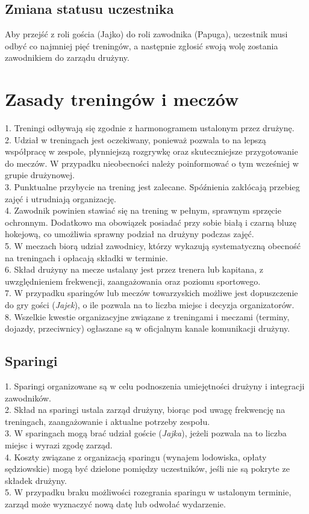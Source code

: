 \documentclass[12pt,a4paper]{article}
\begin{document}
\subsection{Zmiana statusu uczestnika}
Aby przejść z roli gościa (Jajko) do roli zawodnika (Papuga), uczestnik musi odbyć co najmniej pięć treningów, a następnie zgłosić swoją wolę zostania zawodnikiem do zarządu drużyny.

\section{Zasady treningów i meczów}
1. Treningi odbywają się zgodnie z harmonogramem ustalonym przez drużynę.\\
2. Udział w treningach jest oczekiwany, ponieważ pozwala to na lepszą współpracę w zespole, płynniejszą rozgrywkę oraz skuteczniejsze przygotowanie do meczów. W przypadku nieobecności należy poinformować o tym wcześniej w grupie drużynowej.\\
3. Punktualne przybycie na trening jest zalecane. Spóźnienia zakłócają przebieg zajęć i utrudniają organizację.\\
4. Zawodnik powinien stawiać się na trening w pełnym, sprawnym sprzęcie ochronnym. Dodatkowo ma obowiązek posiadać przy sobie białą i czarną bluzę hokejową, co umożliwia sprawny podział na drużyny podczas zajęć.\\
5. W meczach biorą udział zawodnicy, którzy wykazują systematyczną obecność na treningach i opłacają składki w terminie.\\
6. Skład drużyny na mecze ustalany jest przez trenera lub kapitana, z uwzględnieniem frekwencji, zaangażowania oraz poziomu sportowego.\\
7. W przypadku sparingów lub meczów towarzyskich możliwe jest dopuszczenie do gry gości (\textit{Jajek}), o ile pozwala na to liczba miejsc i decyzja organizatorów.\\
8. Wszelkie kwestie organizacyjne związane z treningami i meczami (terminy, dojazdy, przeciwnicy) ogłaszane są w oficjalnym kanale komunikacji drużyny.

\subsection{Sparingi}
1. Sparingi organizowane są w celu podnoszenia umiejętności drużyny i integracji zawodników.\\
2. Skład na sparingi ustala zarząd drużyny, biorąc pod uwagę frekwencję na treningach, zaangażowanie i aktualne potrzeby zespołu.\\
3. W sparingach mogą brać udział goście (\textit{Jajka}), jeżeli pozwala na to liczba miejsc i wyrazi zgodę zarząd.\\
4. Koszty związane z organizacją sparingu (wynajem lodowiska, opłaty sędziowskie) mogą być dzielone pomiędzy uczestników, jeśli nie są pokryte ze składek drużyny.\\
5. W przypadku braku możliwości rozegrania sparingu w ustalonym terminie, zarząd może wyznaczyć nową datę lub odwołać wydarzenie.
\end{document}
